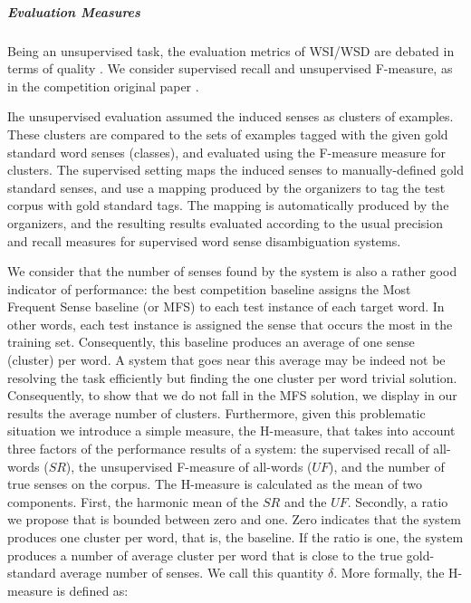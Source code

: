 \subparagraph{Evaluation Measures}
Being an unsupervised task, the evaluation metrics of WSI/WSD are debated in terms of quality \cite{CruysA11}. We consider supervised recall and unsupervised F-measure, as in the competition original paper \cite{Agirre2007}. 

Ihe unsupervised evaluation assumed the induced senses as clusters of examples. These clusters are compared to the sets of examples tagged with the given gold standard word senses (classes), and evaluated using the F-measure measure for clusters. The supervised setting maps the induced senses to manually-defined gold standard senses, and use a mapping produced by the organizers to tag the test corpus with gold standard tags. The mapping is automatically produced by the organizers, and the resulting results evaluated according to the usual precision and recall measures for supervised word sense disambiguation systems. 


We consider that the number of senses found by the system is also a rather good indicator of performance: the best competition baseline assigns the Most Frequent Sense baseline (or MFS) to each test instance of each target word. In other words, each test instance is assigned the sense that occurs the most in the training set. Consequently, this baseline produces an average of one sense (cluster) per word. A system that goes near this average may be indeed not be resolving the task efficiently but finding the one cluster per word trivial solution. Consequently, to show that we do not fall in the MFS solution, we display in our results the average number of clusters. Furthermore, given this problematic situation we introduce a simple measure, the H-measure, that takes into account three factors of the performance results of a system: the supervised recall of all-words ($SR$), the unsupervised F-measure of all-words ($UF$), and the number of true senses on the corpus. The H-measure is calculated as the mean of two components. First, the harmonic mean of the $SR$ and the $UF$. Secondly, a ratio we propose that is bounded between zero and one. Zero indicates that the system produces one cluster per word, that is, the baseline. If the ratio is one, the system produces a number of average cluster per word that is close to the true gold-standard average number of senses. We call this quantity $\delta$. More formally, the H-measure is defined as:

